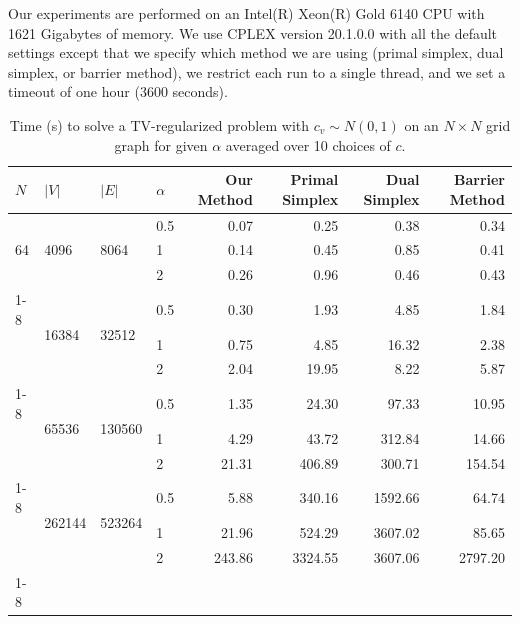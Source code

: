 \documentclass[titlepage,11pt]{article}
\begin{document}
Our experiments are performed on an Intel(R) Xeon(R) Gold 6140 CPU with 1621 Gigabytes of memory. We use CPLEX version 20.1.0.0 with all the default settings except that we specify which method we are using (primal simplex, dual simplex, or barrier method), we restrict each run to a single thread, and we set a timeout of one hour (3600 seconds). 

\begin{table}[]
    \centering
\begin{tabular}{llllrrrr}
\toprule
$N$ & $|V|$ & $|E|$ & $\alpha$ & Our Method & Primal Simplex & Dual Simplex & Barrier Method \\
\midrule
\multirow{3}{*}{64} & \multirow{3}{*}{4096} & \multirow{3}{*}{8064} & 0.5 & 0.07 & 0.25 & 0.38 & 0.34 \\
 & & & 1 & 0.14 & 0.45 & 0.85 & 0.41 \\
 & & & 2 & 0.26 & 0.96 & 0.46 & 0.43 \\
\cline{1-8}
\multirow{3}{*}{128} & \multirow{3}{*}{16384} & \multirow{3}{*}{32512} & 0.5 & 0.30 & 1.93 & 4.85 & 1.84 \\
 & & & 1 & 0.75 & 4.85 & 16.32 & 2.38 \\
 & & & 2 & 2.04 & 19.95 & 8.22 & 5.87 \\
\cline{1-8}
\multirow{3}{*}{256} & \multirow{3}{*}{65536} & \multirow{3}{*}{130560} & 0.5 & 1.35 & 24.30 & 97.33 & 10.95 \\
 & & & 1 & 4.29 & 43.72 & 312.84 & 14.66 \\
 & & & 2 & 21.31 & 406.89 & 300.71 & 154.54 \\
\cline{1-8}
\multirow{3}{*}{512} & \multirow{3}{*}{262144} & \multirow{3}{*}{523264} & 0.5 & 5.88 & 340.16 & 1592.66 & 64.74 \\
 & & & 1 & 21.96 & 524.29 & 3607.02 & 85.65 \\
 & & & 2 & 243.86 & 3324.55 & 3607.06 & 2797.20 \\
\cline{1-8}
\bottomrule
\end{tabular}
    \caption{Time (s) to solve a TV-regularized problem with $c_v \sim N(0,1)$ on an $N\times N$ grid graph for given $\alpha$ averaged over 10 choices of $c$.}
    \label{tab:simplex-results}
\end{table}
\end{document}

